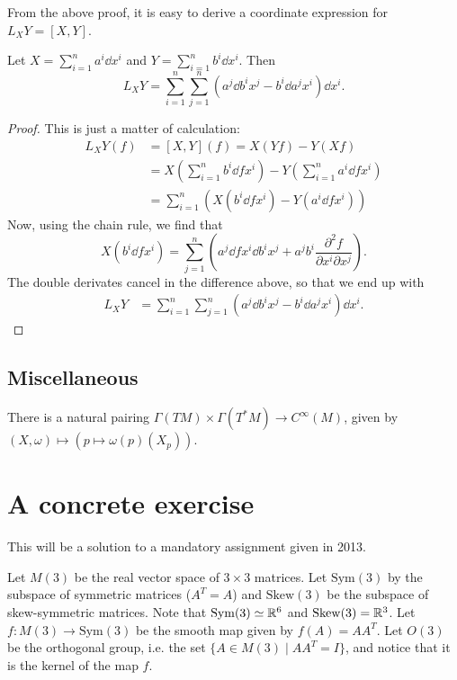 \documentclass[11pt, english]{article}
\begin{document}
From the above proof, it is easy to derive a coordinate expression for $L_XY=[X,Y]$.
\begin{prop}
Let $X=\sum_{i=1}^n a^i \dd{}{x^i}$ and $Y=\sum_{i=1}^n b^i \dd{}{x^i}$. Then
\[
L_XY = \sum_{i=1}^n \sum_{j=1}^n \left( a^j \dd{b^i}{x^j}-b^i\dd{a^j}{x^i}\right) \dd{}{x^i}.
\]
\end{prop}
\begin{proof}
This is just a matter of calculation:
\begin{align*}
L_XY(f) &= [X,Y](f) = X(Yf)-Y(Xf) \\
&= X\left(\sum_{i=1}^n b^i \dd{f}{x^i}\right)-Y\left(\sum_{i=1}^n a^i \dd{f}{x^i}\right) \\
&= \sum_{i=1}^n \left(X\left( b^i \dd{f}{x^i}\right)-Y\left(a^i \dd{f}{x^i}\right) \right)
\end{align*}
Now, using the chain rule, we find that
\[
X\left( b^i \dd{f}{x^i} \right) = \sum_{j=1}^n\left( a^j \dd{f}{x^i}\dd{b^i}{x^j} + a^j b^i \frac{\partial^2 f}{\partial x^i \partial x^j}\right).
\]
The double derivates cancel in the difference above, so that we end up with
\begin{align*}
L_XY &= \sum_{i=1}^n \sum_{j=1}^n \left( a^j \dd{b^i}{x^j}-b^i \dd{a^j}{x^i}\right) \dd{}{x^i}.
\end{align*}

\end{proof}



\subsection{Miscellaneous}

There is a natural pairing $\Gamma(TM) \times \Gamma(T^\ast M) \to C^\infty(M)$, given by $(X,\omega) \mapsto \left(p \mapsto \omega(p)(X_p) \right)$.


\section{A concrete exercise}
This will be a solution to a mandatory assignment given in 2013. 

Let $M(3)$ be the real vector space of $3 \times 3$ matrices. Let $\mathrm{Sym}(3)$ by the subspace of symmetric matrices ($A^T=A$) and $\mathrm{Skew}(3)$ be the subspace of skew-symmetric matrices.  Note that $\mathrm{Sym}(3) \simeq \mathbb{R}^6$ and $\mathrm{Skew}(3)=\mathbb{R}^3$. Let $f:M(3) \to \mathrm{Sym}(3)$ be the smooth map given by $f(A)=AA^T$. Let $O(3)$ be the orthogonal group, i.e. the set $\{ A \in M(3) \mid A A^T=I \}$, and notice that it is the kernel of the map $f$. 
\end{document}

